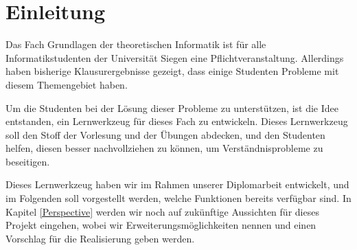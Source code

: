 

\chapter{Einleitung}\label{Introduction}

Das Fach Grundlagen der theoretischen Informatik ist für alle
Informatikstudenten der Universität Siegen eine Pflichtveranstaltung. Allerdings
haben bisherige Klausurergebnisse gezeigt, dass einige Studenten Probleme mit
diesem Themengebiet haben.\vspace{10pt}

Um die Studenten bei der Lösung dieser Probleme zu unterstützen, ist die Idee
entstanden, ein Lernwerkzeug für dieses Fach zu entwickeln. Dieses Lernwerkzeug
soll den Stoff der Vorlesung und der Übungen abdecken, und den Studenten helfen,
diesen besser nachvollziehen zu können, um Verständnisprobleme zu
beseitigen.\vspace{10pt}

Dieses Lernwerkzeug haben wir im Rahmen unserer Diplomarbeit entwickelt, und im
Folgenden soll vorgestellt werden, welche Funktionen bereits verfügbar sind. In
Kapitel \ref{Perspective} werden wir noch auf zukünftige Aussichten für dieses
Projekt eingehen, wobei wir Erweiterungsmöglichkeiten nennen und einen Vorschlag
für die Realisierung geben werden.\vspace{10pt}
